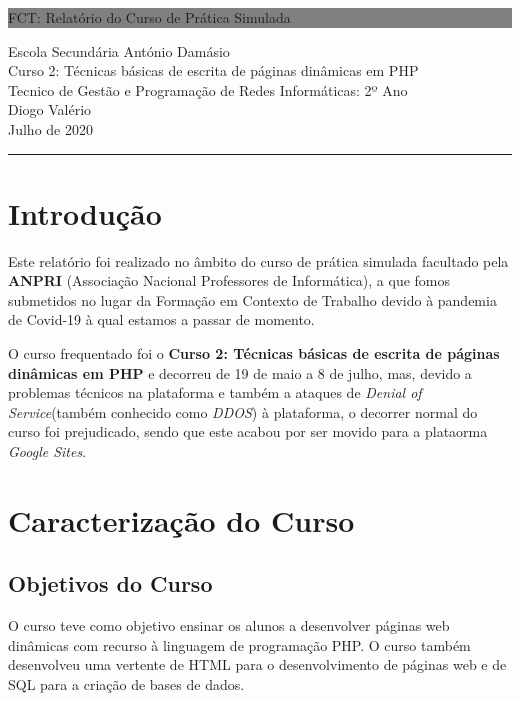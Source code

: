 \documentclass[14pt]{article}
\begin{document}
\begin{titlepage}

	\colorbox{grey}{
		\parbox[t]{0.93\textwidth}{ %
			\parbox[t]{0.91\textwidth}{ %
				\raggedleft
				\fontsize{60pt}{70pt}\selectfont
				\vspace{0.5cm}

				FCT: Relatório do Curso de Prática Simulada\\


				\vspace{0.5cm}
			}
		}
	}
	\vfill

	\parbox[t]{0.93\textwidth}{
		\raggedleft
		\large
		{\Large
   	Escola Secundária António Damásio\\[4pt]
    \large Curso 2: Técnicas básicas de escrita de páginas dinâmicas em PHP\\[2pt]
    \large Tecnico de Gestão e Programação de Redes Informáticas: 2º Ano\\[2pt]
    \Large Diogo Valério}\\[4pt]
    Julho de 2020\\[1pt]
		\hfill\rule{0.6\linewidth}{1pt}
	}
\end{titlepage}


\tableofcontents
\newpage

\section{Introdução} \label{introducao}
Este relatório foi realizado no âmbito do curso de prática simulada facultado pela \textbf{ANPRI} (Associação Nacional Professores de Informática), a que fomos submetidos no lugar da
Formação em Contexto de Trabalho devido à pandemia de Covid-19 à qual estamos a passar de momento.

O curso frequentado foi o \textbf{Curso 2: Técnicas básicas de escrita de páginas dinâmicas em PHP} e decorreu de 19 de maio a
8 de julho, mas, devido a problemas técnicos na plataforma e também a ataques de \textit{Denial of Service}(também conhecido como \textit{DDOS})
à plataforma, o decorrer normal do curso foi prejudicado, sendo que este acabou por ser movido para a plataorma \textit{Google Sites}.


\section{Caracterização do Curso}
\subsection{Objetivos do Curso}
O curso teve como objetivo ensinar os alunos a
desenvolver páginas web dinâmicas com recurso à linguagem de programação PHP.
O curso também desenvolveu uma vertente de HTML para o desenvolvimento de páginas web e de SQL para a criação de bases de dados.
\end{document}
